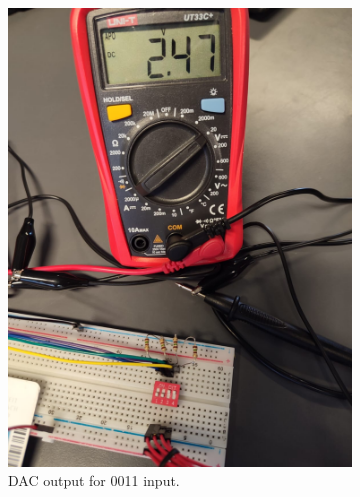 \begin{figure}[H]
\begin{subfigure}[]{0.2\textwidth}
\includegraphics[width=\linewidth]{./Figures/DAC_Prac_0011.jpeg}
\caption{DAC output for 0011 input.} 			
\label{subfig:dac_prac_0011}	
\end{subfigure}
\vfill
\begin{subfigure}[]{0.2\textwidth}

\end{subfigure}
\end{figure}
